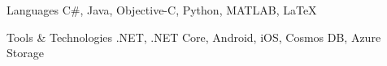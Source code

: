 
\begin{cvskills}

  \cvskill
    {Languages} %
    {C\#, Java, Objective-C, Python, MATLAB, LaTeX} %

  \cvskill
    {Tools \& Technologies} %
    {.NET, .NET Core, Android, iOS, Cosmos DB, Azure Storage} %
    
\end{cvskills}
